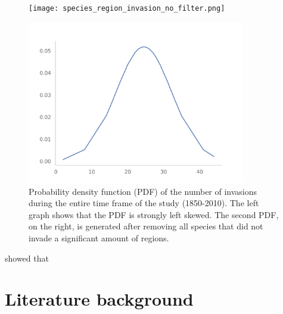 \documentclass[mscthesis]{usiinfthesis}
\begin{document}
 
\begin{figure}
\centering
\begin{minipage}{.5\textwidth}
  \centering
    \texttt{[image: species\_region\_invasion\_no\_filter.png]}
\end{minipage}%
\begin{minipage}{.5\textwidth}
  \centering
    \includegraphics[width=0.85\textwidth]{species_region_invasion.png}
\end{minipage}

\caption{Probability density function (PDF) of the number of invasions during the entire time frame of the study (1850-2010). The left graph shows that the PDF is strongly left skewed. The second PDF, on the right, is generated after removing all species that did not invade a significant amount of regions.}
\label{fig:pdf_invasion}
\end{figure}

\citet{paper:lady} showed that 

\chapter{Literature background}
\end{document}
